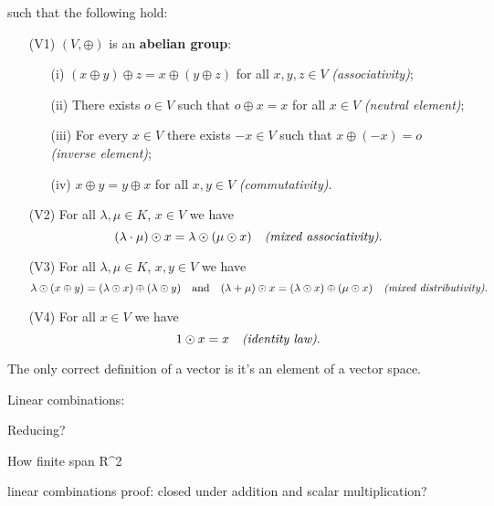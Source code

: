 \documentclass{tufte-handout}
\makeatletter
\renewcommand{\section}{\@startsection{section}%
    {3}{-1.01em}{-3ex \@plus -1ex \@minus -.2ex}%
    {1.5ex \@plus .2ex}
    {\hspace*{-5.5em}\fcolorbox{blue}{blue}{\parbox[c][1.0ex][b]{4em}{\phantom{space}}}
    \normalfont\Large\itshape\color{blue}}}
\makeatother
\begin{document}

such that the following hold:
\begin{itemize}
    \item[(V1)] $(V, \oplus)$ is an \textbf{abelian group}:
    \begin{itemize}
        \item[(i)] $(x \oplus y) \oplus z = x \oplus (y \oplus z)$ for all $x, y, z \in V$ \hfill \textit{(associativity)};
        \item[(ii)] There exists $o \in V$ such that $o \oplus x = x$ for all $x \in V$ \hfill \textit{(neutral element)};
        \item[(iii)] For every $x \in V$ there exists $-x \in V$ such that $x \oplus (-x) = o$ \hfill \textit{(inverse element)};
        \item[(iv)] $x \oplus y = y \oplus x$ for all $x, y \in V$ \hfill \textit{(commutativity)}.
    \end{itemize}
    \item[(V2)] For all $\lambda, \mu \in K$, $x \in V$ we have
    \[
    (\lambda \cdot \mu) \odot x = \lambda \odot (\mu \odot x) \quad \text{\textit{(mixed associativity)}}.
    \]
    \item[(V3)] For all $\lambda, \mu \in K$, $x, y \in V$ we have
    \[
    \lambda \odot (x \oplus y) = (\lambda \odot x) \oplus (\lambda \odot y) \quad \text{and} \quad (\lambda + \mu) \odot x = (\lambda \odot x) \oplus (\mu \odot x) \quad \text{\textit{(mixed distributivity)}}.
    \]
    \item[(V4)] For all $x \in V$ we have
    \[
    1 \odot x = x \quad \text{\textit{(identity law)}}.
    \]
\end{itemize}

The only correct definition of a vector is it's an element of a vector space.

Linear combinations:

Reducing?

How finite span R^2

linear combinations proof: closed under addition and scalar multiplication?

\makeatletter
  \renewcommand{\section}{\@startsection{section}%
    {3}{0.8em}{-3ex \@plus -1ex \@minus -.2ex}%
    {1.5ex \@plus .2ex}
    {\hspace*{-5.5em}\fcolorbox{Periwinkle}{Periwinkle}{\parbox[c][1.0ex][b]{4em}{\phantom{space}}}
    \normalfont\Large\itshape\color{blue}}}
\makeatother



\end{document}
